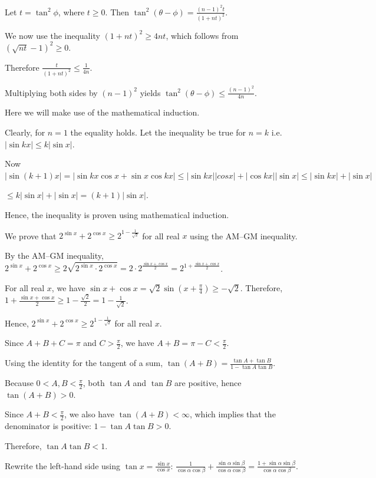   Let $t = \tan^2 \phi$, where $t \ge 0$.
  Then
  $\tan^2(\theta - \phi) = \frac{(n - 1)^2 t}{(1 + n t)^2}$.

  We now use the inequality
  $(1 + n t)^2 \ge 4 n t$,
  which follows from $(\sqrt{n t} - 1)^2 \ge 0$.

  Therefore
  $\frac{t}{(1 + n t)^2} \le \frac{1}{4n}$.

  Multiplying both sides by $(n - 1)^2$ yields
  $\tan^2(\theta - \phi) \le \frac{(n - 1)^2}{4n}$.
\item Here we will make use of the mathematical induction.

  Clearly, for $n = 1$ the equality holds. Let the inequality be true for $n = k$ i.e. $|\sin kx|\leq k|\sin
  x|$.

  Now $|\sin(k + 1)x| = |\sin kx\cos x + \sin x\cos kx|\leq |\sin kx||cos x| + |\cos kx||\sin x|\leq |\sin
  kx| + |\sin x|$

  $\leq k|\sin x| + |\sin x| = (k + 1)|\sin x|$.

  Hence, the inequality is proven using mathematical induction.
\item We prove that $2^{\sin x}+2^{\cos x}\ge 2^{1-\frac1{\sqrt2}}$ for all real $x$ using the AM--GM inequality.

  By the AM--GM inequality,
  $2^{\sin x}+2^{\cos x}\ge 2\sqrt{2^{\sin x}\cdot 2^{\cos x}}=2\cdot 2^{\frac{\sin x+\cos x}{2}}=2^{1+\frac{\sin x+\cos x}{2}}$.

  For all real $x$, we have $\sin x+\cos x=\sqrt2\sin(x+\frac\pi4)\ge -\sqrt2$. Therefore,
  $1+\frac{\sin x+\cos x}{2}\ge 1-\frac{\sqrt2}{2}=1-\frac1{\sqrt2}$.

  Hence,
  $2^{\sin x}+2^{\cos x}\ge 2^{1-\frac1{\sqrt2}}$ for all real $x$.
\item Since $A+B+C=\pi$ and $C>\frac\pi2$, we have
  $A+B=\pi-C<\frac\pi2$.

  Using the identity for the tangent of a sum,
  $\tan(A+B)=\frac{\tan A+\tan B}{1-\tan A\tan B}$.

  Because $0<A,B<\frac\pi2$, both $\tan A$ and $\tan B$ are positive, hence $\tan(A+B)>0$.

  Since $A+B<\frac\pi2$, we also have $\tan(A+B)<\infty$, which implies that the denominator is positive:
  $1-\tan A\tan B>0$.

  Therefore,
  $\tan A\tan B<1$.
\item Rewrite the left-hand side using $\tan x=\frac{\sin x}{\cos x}$:
  $\frac{1}{\cos\alpha\cos\beta}+\frac{\sin\alpha\sin\beta}{\cos\alpha\cos\beta}
  =\frac{1+\sin\alpha\sin\beta}{\cos\alpha\cos\beta}$.

